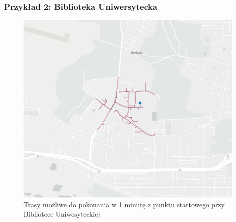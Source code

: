 \documentclass{article}
\begin{document}
\subsubsection{Przykład 2: Biblioteka Uniwersytecka}
\begin{figure}[H]
    \centering
    \includegraphics[width=1\textwidth]{img/umk-1-min.png}
    \caption{Trasy możliwe do pokonania w 1 minutę z punktu startowego przy Bibliotece Uniwesyteckiej}
\end{figure}
\end{document}
